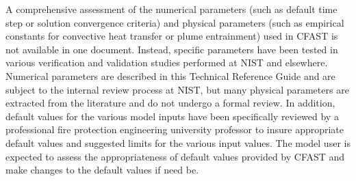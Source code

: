 A comprehensive assessment of the numerical parameters (such as default time step or solution convergence criteria) and physical parameters (such as empirical constants for convective heat transfer or plume entrainment) used in CFAST is not available in one document. Instead, specific parameters have been tested in various verification and validation studies performed at NIST and elsewhere. Numerical parameters are described in this Technical Reference Guide and are subject to the internal review process at NIST, but many physical parameters are extracted from the literature and do not undergo a formal review. In addition, default values for the various model inputs have been specifically reviewed by a professional fire protection engineering university professor to insure appropriate default values and suggested limits for the various input values. The model user is expected to assess the appropriateness of default values provided by CFAST and make changes to the default values if need be. 